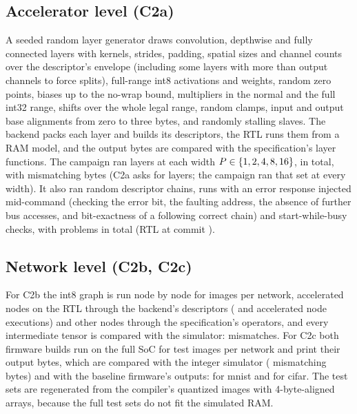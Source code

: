 \documentclass[journal]{IEEEtran}
\begin{document}
\subsection{Accelerator level (C2a)}
A seeded random layer generator draws convolution, depthwise and fully connected layers with kernels, strides, padding, spatial sizes and channel counts over the descriptor's envelope (including some layers with more than \WbufRows{} output channels to force splits), full-range int8 activations and weights, random zero points, biases up to the no-wrap bound, multipliers in the normal and the full int32 range, shifts over the whole legal range, random clamps, input and output base alignments from zero to three bytes, and randomly stalling slaves. The backend packs each layer and builds its descriptors, the RTL runs them from a RAM model, and the output bytes are compared with the specification's layer functions. The campaign ran \MThreePerP{} layers at each width $P\in\{1, 2, 4, 8, 16\}$, \MeasCtwoALayers{} in total, with \MeasCtwoAMismatch{} mismatching bytes (C2a asks for \RandomLayers{} layers; the campaign ran that set at every width). It also ran \MThreeChainsTotal{} random descriptor chains, \MThreeErrorsTotal{} runs with an error response injected mid-command (checking the error bit, the faulting address, the absence of further bus accesses, and bit-exactness of a following correct chain) and \MThreeBusyTotal{} start-while-busy checks, with \MThreeProblemsTotal{} problems in total (RTL at commit \texttt{\MThreeCommit}).

\subsection{Network level (C2b, C2c)}
For C2b the int8 graph is run node by node for \MeasCtwoBImages{} images per network, accelerated nodes on the RTL through the backend's descriptors (\MThreeNodesMnist{} and \MThreeNodesCifar{} accelerated node executions) and other nodes through the specification's operators, and every intermediate tensor is compared with the simulator: \MeasCtwoBMismatch{} mismatches. For C2c both firmware builds run on the full SoC for \MeasCtwoCImages{} test images per network and print their output bytes, which are compared with the integer simulator (\MeasCtwoCMismatch{} mismatching bytes) and with the baseline firmware's outputs: \MeasCtwoCBaseMnist{} for mnist and \MeasCtwoCBaseCifar{} for cifar. The test sets are regenerated from the compiler's quantized images with 4-byte-aligned arrays, because the full test sets do not fit the simulated RAM.
\end{document}
